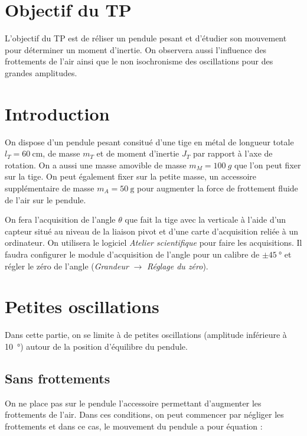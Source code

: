 \documentclass{tp}
\begin{document}

\section{Objectif du TP}
L'objectif du TP est de réliser un pendule pesant et d'étudier son mouvement pour déterminer un moment d'inertie. On observera aussi l'influence des frottements de l'air ainsi que le non isochronisme des oscillations pour des grandes amplitudes.

\section{Introduction}%
\label{sec:introduction}

On dispose d'un pendule pesant consitué d'une tige en métal de longueur totale $l_T=\SI{60}{\cm}$, de masse $m_T$ et de moment d'inertie $J_T$ par rapport à l'axe de rotation. On a aussi une masse amovible de masse $m_M = \SI{100}{g}$ que l'on peut fixer sur la tige. On peut également fixer sur la petite masse, un accessoire supplémentaire de masse $m_A=\SI{50}{\g} $ pour augmenter la force de frottement fluide de l'air sur le pendule.

On fera l'acquisition de l'angle $\theta$ que fait la tige avec la verticale à l'aide d'un capteur situé au niveau de la liaison pivot et d'une carte d'acquisition reliée à un ordinateur. On utilisera le logiciel \textit{Atelier scientifique} pour faire les acquisitions. Il faudra configurer le module d'acquisition de l'angle pour un calibre de $\pm \SI{45}{\degree} $ et régler le zéro de l'angle (\textit{Grandeur} $\rightarrow$ \textit{Réglage du zéro}).

\section{Petites oscillations}%
\label{sec:petites_oscillations}
Dans cette partie, on se limite à de petites oscillations (amplitude inférieure à \SI{10}{\degree}) autour de la position d'équilibre du pendule. 

\subsection{Sans frottements}%
\label{sub:sans_frottements}
On ne place pas sur le pendule l'accessoire permettant d'augmenter les frottements de l'air. Dans ces conditions, on peut commencer par négliger les frottements et dans ce cas, le mouvement du pendule a pour équation :
\end{document}
